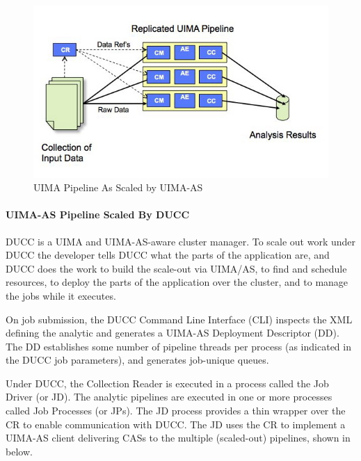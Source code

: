     \begin{figure}[H]
      \centering
      \includegraphics[bb=0 0 584 341, width=5.5in]{images/uima-as-pipeline.jpg}
      \caption{UIMA Pipeline As Scaled by UIMA-AS}
      \label{fig:UIMA-AS-pipeline}
    \end{figure}

    \paragraph{UIMA-AS Pipeline Scaled By DUCC}
    DUCC is a UIMA and  UIMA-AS-aware cluster manager.  To scale out work under DUCC the developer
    tells DUCC what the parts of the application are, and DUCC does the work to build the
    scale-out via UIMA/AS, to find and schedule resources, to deploy the parts of the application
    over the cluster, and to manage the jobs while it executes.

    On job submission, the DUCC Command Line Interface (CLI) inspects the XML defining the analytic
    and generates a UIMA-AS Deployment Descriptor (DD).  The DD establishes some number of pipeline
    threads per process (as indicated in the DUCC job parameters), and generates job-unique queues.

    Under DUCC, the Collection Reader is executed in a process called the Job Driver (or JD). The 
    analytic pipelines are executed in one or more processes called Job Processes (or JPs). The JD 
    process provides a thin wrapper over the CR to enable communication with DUCC.  The JD uses the
    CR to implement a UIMA-AS client delivering CASs to the multiple (scaled-out) pipelines, 
    shown in  below.

